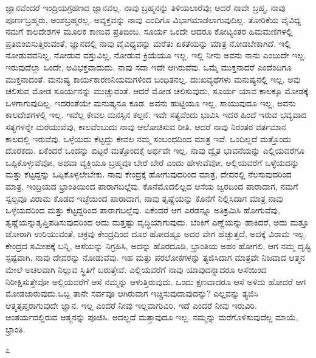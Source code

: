 ಜ್ಞಾನವೆಂದರೆ ಇಂದ್ರಿಯಗ್ರಹಣದ ಜ್ಞಾನವಲ್ಲ. ನಾವು ಬ್ರಹ್ಮನನ್ನು ತಿಳಿಯಲಾರೆವು; ಆದರೆ ನಾವೇ ಬ್ರಹ್ಮ, ನಾವು ಪೂರ್ಣಬ್ರಹ್ಮರು, ಅಂಶಬ್ರಹ್ಮರಲ್ಲ. ಅವ್ಯಕ್ತವನ್ನು ನಾವು ಎಂದಿಗೂ ವಿಭಾಗಮಾಡಲಾಗುವುದಿಲ್ಲ. ತೋರಿಕೆಯ ವೈವಿಧ್ಯ ನಮಗೆ ಕಾಲದೇಶಗಳ ಮೂಲಕ ಕಾಣುವ ಪ್ರತಿಬಿಂಬ. ಸೂರ್ಯ ಒಂದೇ ಆದರೂ ಕೋಟ್ಯಂತರ ಹಿಮಮಣಿಗಳಲ್ಲಿ ಪ್ರತಿಬಿಂಬಿಸುತ್ತಿರುವಂತೆ, ಜ್ಞಾನದಲ್ಲಿ ನಾವು ವೈವಿಧ್ಯವನ್ನು ಮರೆತು ಏಕತೆಯನ್ನು ಮಾತ್ರ ನೋಡಬೇಕಾಗಿದೆ. ಇಲ್ಲಿ ನೋಡುವವನಿಲ್ಲ, ನೋಡುವ ವಸ್ತುವಿಲ್ಲ, ನೋಡುವ ಕ್ರಿಯೆಯೂ ಇಲ್ಲ. ಇಲ್ಲಿ ನೀನು ಅವನು ನಾನು ಎಂಬುದೇ ಇಲ್ಲ. ಇರುವುದೆಲ್ಲಾ ಒಂದೇ, ಅವಿಭಕ್ತವಾದುದು. ನಾವು ಸದಾ ಇದೇ ಆಗಿರುವೆವು. ಒಮ್ಮೆ ಮುಕ್ತನಾದರೆ ಎಂದೆಂದಿಗೂ ಮುಕ್ತನಾದಂತೆ. ಮನುಷ್ಯ ಕಾರ್ಯಕಾರಣನಿಯಮಗಳಿಂದ ಬಂಧಿತನಲ್ಲ. ದುಃಖವ್ಯಥೆಗಳು ಮನುಷ್ಯನಲ್ಲಿ ಇಲ್ಲ. ಅವು ಚಲಿಸುವ ಮೋಡ ಸೂರ್ಯನನ್ನು ಮುಚ್ಚುವಂತೆ. ಆದರೆ ಮೋಡ ಚಲಿಸುವುದು, ಸೂರ್ಯ ಯಾವ ಕಾಲಕ್ಕೂ ಮೋಡಕ್ಕೆ ಒಳಗಾಗುವುದಿಲ್ಲ. ಇದರಂತೆಯೇ ಮನುಷ್ಯನೂ ಕೂಡ. ಅವನು ಹುಟ್ಟಿಯೂ ಇಲ್ಲ, ಸಾಯುವುದೂ ಇಲ್ಲ, ಅವನು ಕಾಲದೇಶಗಳಲ್ಲಿ ಇಲ್ಲ. ಇವೆಲ್ಲ ಕೇವಲ ಮನಸ್ಸಿನ ಕಲ್ಪನೆ. ಇವೇ ಸತ್ಯವೆಂದು ಭಾವಿಸಿ ಇದರ ಹಿಂದೆ ಇರುವ ಭವ್ಯವಾದ ಸತ್ಯಗಳನ್ನೇ ಮರೆಯುವೆವು, ಕಾಲವೆಂಬುದು ನಾವು ಆಲೋಚಿಸುವ ರೀತಿ. ಆದರೆ ನಾವು ನಿರಂತರ ವರ್ತಮಾನ ಕಾಲದಲ್ಲಿ ಇರುವೆವು. ಒಳ್ಳೆಯದು ಕೆಟ್ಟದ್ದು ಕೇವಲ ನಮ್ಮ ಸಂಬಂಧದಿಂದ ಮಾತ್ರ ಇವೆ. ಒಂದಿಲ್ಲದೆ ಮತ್ತೊಂದು ದೊರಕದು. ಏಕೆಂದರೆ ಒಂದನ್ನು ಬಿಟ್ಟರೆ ಮತ್ತೊಂದಕ್ಕೆ ಅರ್ಥವೇ ಇಲ್ಲ. ನಾವು ದ್ವೈತ ಭಾವನೆಯನ್ನು ಎಲ್ಲಿಯವರೆಗೂ ಒಪ್ಪಿಕೊಳ್ಳುವೆವೋ, ಅಥವಾ ವ್ಯಕ್ತಿಯೂ ಬ್ರಹ್ಮವೂ ಬೇರೆ ಬೇರೆ ಎಂದು ಹೇಳುವೆವೋ, ಅಲ್ಲಿಯವರೆಗೆ ಒಳ್ಳೆಯದನ್ನು ಮತ್ತು ಕೆಟ್ಟದ್ದನ್ನು ಒಪ್ಪಿಕೊಳ್ಳಲೇಬೇಕು. ನಾವು ಕೇಂದ್ರಕ್ಕೆ ಹೋಗುವುದರಿಂದ ಮಾತ್ರ, ದೇವರಲ್ಲಿ ನೆಲಸುವುದರಿಂದ ಮಾತ್ರ, ಇಂದ್ರಿಯದ ಭ್ರಾಂತಿಯಿಂದ ಪಾರಾಗಬಲ್ಲೆವು. ಕೊನೆಮೊದಲಿಲ್ಲದ ಆಸೆಯ ಜ್ವರದಿಂದ ಪಾರಾದಾಗ, ನಮಗೆ ಸ್ವಲ್ಪವೂ ವಿರಾಮ ಕೊಡದ ಇಚ್ಛೆಯಿಂದ ಪಾರಾದಾಗ, ನಾವು ತೃಷ್ಣೆಯನ್ನು ಕೊನೆಗೆ ನಿಲ್ಲಿಸಿದಾಗ ಮಾತ್ರ ನಾವು ಒಳ್ಳೆಯದರಿಂದ ಮತ್ತು ಕೆಟ್ಟದ್ದರಿಂದ ಪಾರಾಗಬಲ್ಲೆವು. ಏಕೆಂದರೆ ಆಗ ಎರಡನ್ನೂ ಅತಿಕ್ರಮಿಸಿ ಹೋಗುವೆವು, ತೃಷ್ಣೆಯನ್ನು\break ತೃಪ್ತಿಪಡಿಸುವುದರಿಂದ ಅದು ಮತ್ತಷ್ಟು ವೃದ್ಧಿಯಾಗುವುದು. ಬೆಂಕಿಗೆ ಎಣ್ಣೆಯನ್ನು ಹಾಕಿದರೆ, ಅದು ಮತ್ತೂ ಜೋರಾಗಿ ಉರಿಯುವಂತೆ, ಚಕ್ರವು ಕೇಂದ್ರದಿಂದ ದೂರ ಹೋದಷ್ಟೂ ಅದರ ವೇಗ ಹೆಚ್ಚುತ್ತದೆ, ಅದಕ್ಕೆ ವಿರಾಮ ಇಲ್ಲ. ಕೇಂದ್ರದ ಸಮೀಪಕ್ಕೆ ಬನ್ನಿ, ಆಸೆಯನ್ನು ನಿಗ್ರಹಿಸಿ, ಅದನ್ನು ಹೊರದೂಡಿ, ಭ್ರಾಂತಿಯ ಅಹಂ ಹೋಗಲಿ, ಆಗ ನಮ್ಮ ದೃಷ್ಟಿ ಸ್ಪಷ್ಟವಾಗಿ, ನಾವು ದೇವರನ್ನು ನೋಡುವೆವು. ಇಹ ಮತ್ತು ಪರಲೋಕಗಳನ್ನು ತ್ಯಜಿಸಿದಾಗ ಮಾತ್ರವೇ ನಿಜವಾದ ಆತ್ಮನ ಮೇಲೆ ಅಚಲವಾಗಿ ನಿಲ್ಲುವ ಸ್ಥಿತಿಗೆ ಬರುತ್ತೇವೆ. ಎಲ್ಲಿಯವರೆಗೆ ನಾವು ಯಾವುದನ್ನಾದರೂ ಆಸೆಯಿಂದ ನಿರೀಕ್ಷಿಸುತ್ತೇವೋ ಅಲ್ಲಿಯವರೆಗೆ ಆಸೆ ನಮ್ಮನ್ನು ಆಳುತ್ತಿರುವುದು. ಒಂದು ಕ್ಷಣವಾದರೂ ಆಸೆ ಅಳಿದು ಹೋದರೆ ಆಗ ಮೋಡಜಾರುವುದು.ಒಬ್ಬ ತಾನೇ ಸರ್ವವೂ ಆಗಿರುವಾಗ ಇಚ್ಚಿಸುವುದಾವುದನ್ನು? ಎಲ್ಲವನ್ನು ತ್ಯಜಿಸಿ ಆತ್ಮತೃಪ್ತರಾಗುವುದೇ ಜ್ಞಾನ. ಇಲ್ಲ ಎಂದರೆ ನೀವು ಇಲ್ಲವಾಗುವಿರಿ, ಇದೆ ಎಂದರೆ ನೀವು ಇರುವಿರಿ. ಆಂತರ್ಯದಲ್ಲಿರುವ ಆತ್ಮನನ್ನು ಪೂಜಿಸಿ. ಅದಲ್ಲದೆ ಮತ್ತಾವುದೂ ಇಲ್ಲ. ನಮ್ಮನ್ನು ಮರೆಗೊಳಿಸುವುದೆಲ್ಲ ಮಾಯೆ, ಭ್ರಾಂತಿ.

\begin{center}
೭
\end{center}

